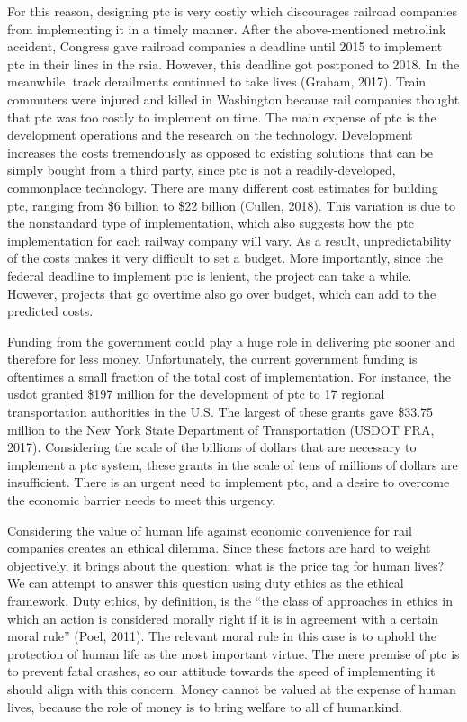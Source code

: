 \documentclass[11pt, titlepage]{article}
\begin{document}
For this reason, designing \gls{ptc} is very costly which discourages railroad
companies from implementing it in a timely manner. After the above-mentioned
\gls{metrolink} accident, Congress gave railroad companies a deadline until 2015 to
implement \gls{ptc} in their lines in the \gls{rsia}. However, this deadline got
postponed to 2018. In the meanwhile, track derailments continued to take lives
(Graham, 2017). Train commuters were injured and killed in Washington because rail
companies thought that \gls{ptc} was too costly to implement on time. The main
expense of \gls{ptc} is the development operations and the research on the
technology. Development increases the costs tremendously as opposed to existing
solutions that can be simply bought from a third party, since \gls{ptc} is not a
readily-developed, commonplace technology. There are many different cost estimates
for building \gls{ptc}, ranging from \$6 billion to \$22 billion (Cullen, 2018).
This variation is due to the nonstandard type of implementation, which also suggests
how the \gls{ptc} implementation for each railway company will vary. As a result,
unpredictability of the costs makes it very difficult to set a budget. More
importantly, since the federal deadline to implement \gls{ptc} is lenient, the
project can take a while. However, projects that go overtime also go over budget,
which can add to the predicted costs.

Funding from the government could play a huge role in delivering \gls{ptc} sooner
and therefore for less money. Unfortunately, the current government funding is
oftentimes a small fraction of the total cost of implementation. For instance, the
\gls{usdot} granted \$197 million for the development of \gls{ptc} to 17 regional
transportation authorities in the U.S. The largest of these grants gave \$33.75
million to the New York State Department of Transportation (USDOT FRA, 2017).
Considering the scale of the billions of dollars that are necessary to implement a
\gls{ptc} system, these grants in the scale of tens of millions of dollars are
insufficient. There is an urgent need to implement \gls{ptc}, and a desire to overcome
the economic barrier needs to meet this urgency.

Considering the value of human life against economic convenience for rail companies
creates an ethical dilemma. Since these factors are hard to weight objectively, it
brings about the question: what is the price tag for human lives? We can attempt to
answer this question using duty ethics as the ethical framework. Duty ethics, by
definition, is the ``the class of approaches in ethics in which an action is
considered morally right if it is in agreement with a certain moral rule'' (Poel,
2011). The relevant moral rule in this case is to uphold the protection of human
life as the most important virtue. The mere premise of \gls{ptc} is to prevent fatal
crashes, so our attitude towards the speed of implementing it should align with this
concern. Money cannot be valued at the expense of human lives, because the role of
money is to bring welfare to all of humankind.
\end{document}
